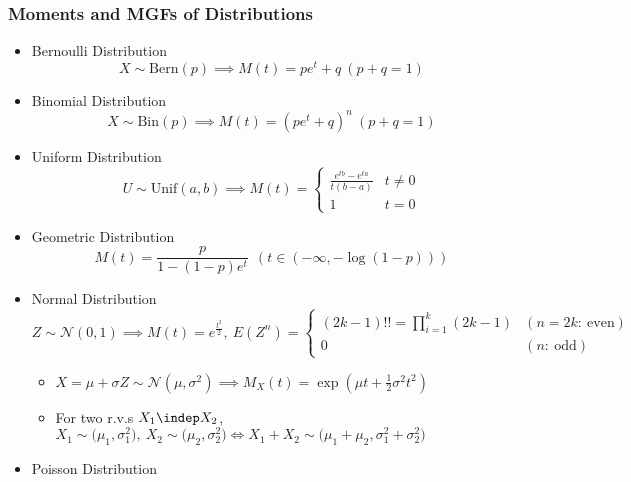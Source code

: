 \subsubsection*{Moments and MGFs of Distributions}
\begin{itemize}
    \item Bernoulli Distribution
    \begin{equation}
        X\sim\text{Bern}(p)\implies M(t)=pe^t+q~(p+q=1)
    \end{equation}
    \item Binomial Distribution
    \begin{equation}
        X\sim\text{Bin}(p)\implies M(t)=(pe^t+q)^n~(p+q=1)
    \end{equation}
    \item Uniform Distribution
    \begin{equation}
        U\sim\text{Unif}(a,b)\implies M(t)=\begin{cases}
            \frac{e^{tb}-e^{ta}}{t(b-a)} & t\neq 0\\
            1 & t=0
        \end{cases}
    \end{equation}
    \item Geometric Distribution
    \begin{equation}
        M(t)=\frac{p}{1-(1-p)e^t}~~\left(t\in\left(-\infty,-\log(1-p)\right)\right)
    \end{equation}
    \item Normal Distribution
    \begin{equation}
        Z\sim\mathcal{N}(0,1)\implies M(t)=e^{\frac{t^2}{2}},~E(Z^n)=\begin{cases}
            (2k-1)!!=\prod_{i=1}^k(2k-1) & (n=2k:~\text{even})\\
            0 & (n:~\text{odd})
        \end{cases}
    \end{equation}
    \begin{itemize}
        \item $X=\mu+\sigma Z\sim\mathcal{N}(\mu,\sigma^2)\implies M_X(t)=\exp\left(\mu t+\frac{1}{2}\sigma^2t^2\right)$
        \item For two r.v.s $X_1\indep X_2$, $X_1\sim\mathcal(\mu_1,\sigma_1^2),~X_2\sim\mathcal(\mu_2,\sigma_2^2)\iff X_1+X_2\sim\mathcal(\mu_1+\mu_2,\sigma_1^2+\sigma_2^2)$
    \end{itemize}
    \item Poisson Distribution
    \begin{equation}

\end{equation}
\end{itemize}
